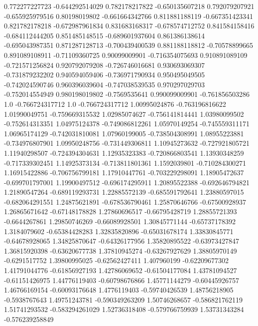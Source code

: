  0.772277227723  -0.644292514029
 0.782178217822  -0.650135607218
 0.792079207921  -0.655925979516
  0.80198019802  -0.661664342766
 0.811881188119  -0.667351423341
 0.821782178218  -0.672987961834
 0.831683168317  -0.678574712752
 0.841584158416  -0.684112444205
 0.851485148515  -0.689601937604
 0.861386138614  -0.695043987351
 0.871287128713  -0.700439400539
 0.881188118812   -0.70578899665
 0.891089108911   -0.71109360725
  0.90099009901  -0.716354075693
 0.910891089109  -0.721571256824
 0.920792079208  -0.726746016681
 0.930693069307  -0.731879232202
 0.940594059406  -0.736971790934
 0.950495049505  -0.742024590746
 0.960396039604  -0.747038539535
 0.970297029703  -0.752014554949
 0.980198019802    -0.7569535641
 0.990099009901  -0.761856503286
            1.0  -0.766724317712
            1.0  -0.766724317712
  1.00995024876  -0.763196816622
  1.01990049751  -0.759669315532
  1.02985074627  -0.756141814441
  1.03980099502  -0.752614313351
  1.04975124378  -0.749086812261
  1.05970149254  -0.745559311171
  1.06965174129  -0.742031810081
  1.07960199005  -0.738504308991
  1.08955223881  -0.734976807901
  1.09950248756  -0.731449306811
  1.10945273632  -0.727921805721
  1.11940298507  -0.724394304631
  1.12935323383  -0.720866803541
  1.13930348259  -0.717339302451
  1.14925373134  -0.713811801361
   1.1592039801  -0.710284300271
  1.16915422886  -0.706756799181
  1.17910447761  -0.703229298091
  1.18905472637  -0.699701797001
  1.19900497512  -0.696174295911
  1.20895522388  -0.692646794821
  1.21890547264  -0.689119293731
  1.22885572139  -0.685591792641
  1.23880597015  -0.682064291551
  1.24875621891  -0.678536790461
  1.25870646766   -0.67500928937
  1.26865671642   -0.67148178828
  1.27860696517   -0.66795428719
  1.28855721393    -0.6644267861
  1.29850746269   -0.66089928501
  1.30845771144   -0.65737178392
   1.3184079602   -0.65384428283
  1.32835820896   -0.65031678174
  1.33830845771   -0.64678928065
  1.34825870647   -0.64326177956
  1.35820895522   -0.63973427847
  1.36815920398   -0.63620677738
  1.37810945274   -0.63267927629
  1.38805970149    -0.6291517752
  1.39800995025   -0.62562427411
    1.407960199   -0.62209677302
  1.41791044776   -0.61856927193
  1.42786069652   -0.61504177084
  1.43781094527   -0.61151426975
  1.44776119403   -0.60798676866
  1.45771144279   -0.60445926757
  1.46766169154   -0.60093176648
   1.4776119403   -0.59740426539
  1.48756218905    -0.5938767643
  1.49751243781  -0.590349263209
  1.50746268657  -0.586821762119
  1.51741293532  -0.583294261029
  1.52736318408  -0.579766759939
  1.53731343284  -0.576239258849
